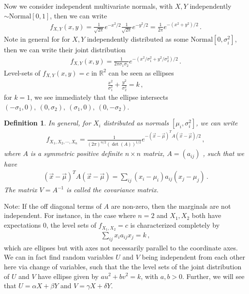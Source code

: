 \documentclass[11pt, onesided]{book}
\theoremstyle{break}
\theoremstyle{break}
\newtheorem{defn}{Definition}[thm]
\newcommand{\R}{\mathbb{R}}
\newcommand{\note}{\color{red}Note: \color{black}}
\begin{document}
Now we consider independent multivariate normals, with $X,Y$ independently $\sim\text{Normal}[0,1]$, then we can write
\begin{align*}
f_{X,Y}(x,y) = \frac{1}{\sqrt{2\pi}}e^{-x^2/2} \frac{1}{\sqrt{2\pi}}e^{-y^2/2} = \frac{1}{2\pi}e^{-(x^2 +y^2)/2}\,.
\end{align*}
Note in general for for $X,Y$ independently distributed as some $\text{Normal}[0, \sigma_i^2]$, then we can write their joint distribution
\begin{align*}
f_{X,Y}(x,y ) = \frac{1}{2\pi \sigma_1 \sigma_2}e^{-(x^2/\sigma_1^2 +y^2/\sigma_2^2)/2}\,.
\end{align*}
Level-sets of $f_{X,Y}(x,y) = c$ in $\R^2$ can be seen as ellipses
\begin{align*}
\frac{x^2}{\sigma_1^2} + \frac{y^2}{\sigma_2^2} = k\,,
\end{align*}
for $k= 1$, we see immediately that the ellipse intersects $(-\sigma_1,0), \ (0,\sigma_2),\ (\sigma_1,0 ), \ (0,-\sigma_2)$.
\begin{defn}
In general, for $X_i$ distributed as normals $[\mu_i,\sigma_i^2]$, we can write
\begin{align*}
f_{X_1,X_2,\cdots, X_n} = \frac{1}{(2\pi)^{n/2} (\det(A))^{1/2}} e^{-(\vec{x}- \vec{\mu})^T A(\vec{x} - \vec{\mu})/2}\,,
\end{align*}
where $A$ is a symmetric positive definite $n\times n$ matrix, $A = (a_{ij})$ , such that we have
\begin{align*}
(\vec{x}- \vec{\mu})^T A(\vec{x} - \vec{\mu}) = \sum_{ij}(x_i-\mu_i) a_{ij}(x_j-\mu_j)\,.
\end{align*}
The matrix $V = A^{-1}$ is called the covariance matrix. 
\end{defn}

\note If the off diagonal terms of $A$ are non-zero, then the marginals are not independent. For instance, in the case where $n = 2$ and $X_1,X_2$ both have expectations $0$, the level sets of $f_{X_1,X_2} = c$ is characterized completely by
\begin{align*}
\sum_{ij}x_i a_{ij}x_j = k\,,
\end{align*}
which are ellipses but with axes not necessarily parallel to the coordinate axes. We can in fact find random variables $U$ and $V$ being independent from each other here via change of variables, such that the the level sets of the joint distribution of $U$ and $V$ have ellipse given by $au^2 + bv^2 = k$, with $a, b >0$. Further, we will see that $U = \alpha X + \beta Y$ and $V = \gamma X + \delta Y$.\\
\end{document}
